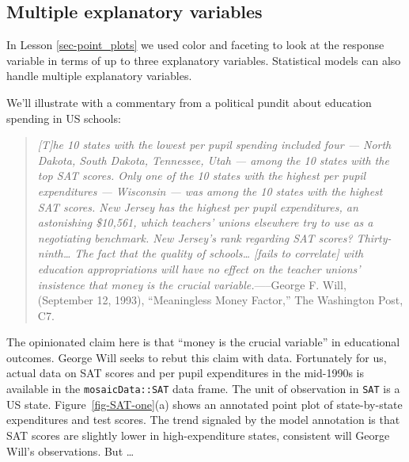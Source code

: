 \documentclass[
  letterpaper,
  DIV=11,
  numbers=noendperiod,
  oneside]{scrartcl}
\begin{document}
\subsection{Multiple explanatory
variables}\label{multiple-explanatory-variables}

In Lesson \ref{sec-point_plots} we used color and faceting to look at
the response variable in terms of up to three explanatory variables.
Statistical models can also handle multiple explanatory variables.

We'll illustrate with a commentary from a political pundit about
education spending in US schools:

\begin{quote}
\emph{{[}T{]}he 10 states with the lowest per pupil spending included
four --- North Dakota, South Dakota, Tennessee, Utah --- among the 10
states with the top SAT scores. Only one of the 10 states with the
highest per pupil expenditures --- Wisconsin --- was among the 10 states
with the highest SAT scores. New Jersey has the highest per pupil
expenditures, an astonishing \$10,561, which teachers' unions elsewhere
try to use as a negotiating benchmark. New Jersey's rank regarding SAT
scores? Thirty-ninth\ldots{} The fact that the quality of
schools\ldots{} {[}fails to correlate{]} with education appropriations
will have no effect on the teacher unions' insistence that money is the
crucial variable.}-----George F. Will, (September 12, 1993),
``Meaningless Money Factor,'' The Washington Post, C7.
\end{quote}

The opinionated claim here is that ``money is the crucial variable'' in
educational outcomes. George Will seeks to rebut this claim with data.
Fortunately for us, actual data on SAT scores and per pupil expenditures
in the mid-1990s is available in the \texttt{mosaicData::SAT} data
frame. The unit of observation in \texttt{SAT} is a US state.
Figure~\ref{fig-SAT-one}(a) shows an annotated point plot of
state-by-state expenditures and test scores. The trend signaled by the
model annotation is that SAT scores are slightly lower in
high-expenditure states, consistent will George Will's observations. But
\ldots{}
\end{document}
